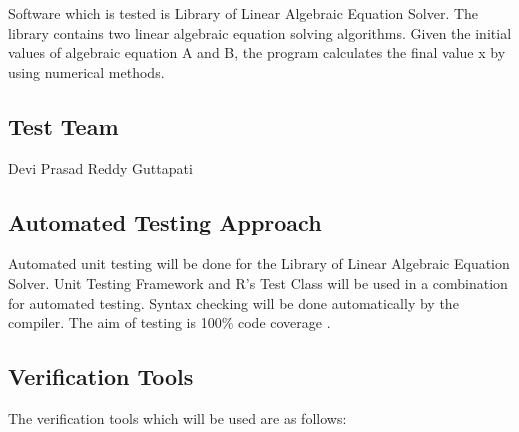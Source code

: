 \documentclass[12pt, titlepage]{article}
\begin{document}
Software which is tested is Library of Linear Algebraic Equation Solver. The
library contains two linear algebraic equation solving algorithms. Given the
initial values of algebraic equation A and B, the program calculates the final
value x by using numerical methods.  

\subsection{Test Team}

Devi Prasad Reddy Guttapati

\subsection{Automated Testing Approach}

Automated unit testing will be done for the Library of Linear Algebraic Equation
Solver. Unit Testing Framework and R's Test Class will be used in a combination
for automated testing. Syntax checking will be done automatically by the
compiler. The aim of testing is 100\%  code coverage .

\subsection{Verification Tools}

The verification tools which will be used are as follows:
\end{document}
